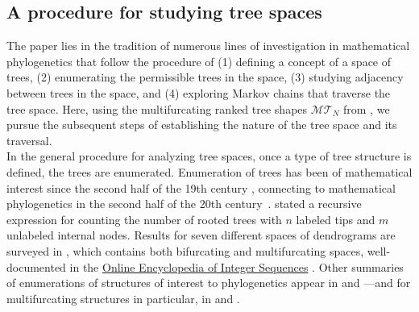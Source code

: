 \documentclass{article}
\begin{document}
\subsection{A procedure for studying tree spaces}

The paper lies in the tradition of numerous lines of investigation in mathematical phylogenetics that follow the procedure of (1) defining a concept of a space of trees, (2) enumerating the permissible trees in the space, (3) studying adjacency between trees in the space, and (4) exploring Markov chains that traverse the tree space. Here, using the multifurcating ranked tree shapes $\mathcal{MT}_N$ from \cite{Murtagh1984}, we pursue the subsequent steps of establishing the nature of the tree space and its traversal. \\

In the general procedure for analyzing tree spaces, once a type of tree structure is defined, the trees are enumerated. Enumeration of trees has been of mathematical interest since the second half of the 19th century \citep{cayley1856note, schroder1870vier}, connecting to mathematical phylogenetics in the second half of the 20th century~\citep{rosenberg2025mathematical}. \cite{felsenstein1978number} stated a recursive expression for counting the number of rooted trees with $n$ labeled tips and $m$ unlabeled internal nodes. Results for seven different spaces of dendrograms are surveyed in \citep{Murtagh1984}, which contains both bifurcating and multifurcating spaces, well-documented in the \href{https://oeis.org}{Online Encyclopedia of Integer Sequences} \citep{sloane2003line}. Other summaries of enumerations of structures of interest to phylogenetics appear in \cite{semple2003phylogenetics} and \cite{steel2016phylogeny}---and for multifurcating structures in particular, in \cite{wirtz2022enumeration} and \cite{dickey2025labelled}. \\

\end{document}
